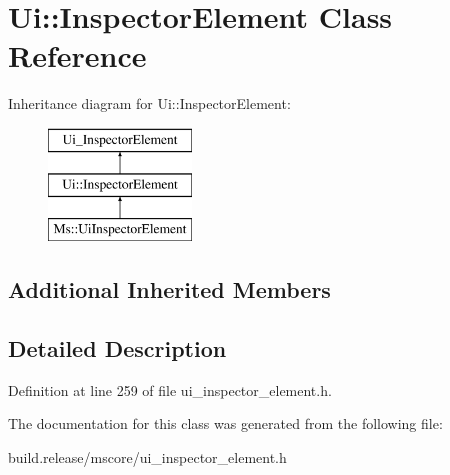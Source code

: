 \hypertarget{class_ui_1_1_inspector_element}{}\section{Ui\+:\+:Inspector\+Element Class Reference}
\label{class_ui_1_1_inspector_element}
Inheritance diagram for Ui\+:\+:Inspector\+Element\+:\begin{figure}[H]
\begin{center}
\leavevmode
\includegraphics[height=3.000000cm]{class_ui_1_1_inspector_element}
\end{center}
\end{figure}
\subsection*{Additional Inherited Members}


\subsection{Detailed Description}


Definition at line 259 of file ui\+\_\+inspector\+\_\+element.\+h.



The documentation for this class was generated from the following file\+:\begin{DoxyCompactItemize}
\item 
build.\+release/mscore/ui\+\_\+inspector\+\_\+element.\+h\end{DoxyCompactItemize}
